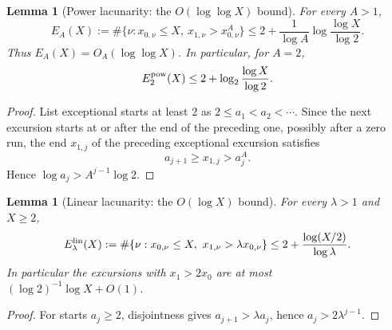 \documentclass[11pt]{amsart}
\numberwithin{equation}{section}
\theoremstyle{plain}
\newtheorem{lemma}[theorem]{Lemma}
\theoremstyle{definition}
\theoremstyle{remark}
\begin{document}
\begin{lemma}[Power lacunarity: the $O(\log\log X)$ bound]
\label{lem:power-lacunary}
For every $A>1$,
\begin{equation}
\label{eq:power-lacunary-count}
E_A(X):=\#\{\nu:x_{0,\nu}\le X,\ x_{1,\nu}>x_{0,\nu}^A\}
\le2+\frac1{\log A}\log\frac{\log X}{\log2}.
\end{equation}
Thus $E_A(X)=O_A(\log\log X)$. In particular, for $A=2$,
\begin{equation}
\label{eq:square-exception-count}
E_2^{\rm pow}(X)\le2+\log_2\frac{\log X}{\log2}.
\end{equation}
\end{lemma}

\begin{proof}
List exceptional starts at least $2$ as $2\le a_1<a_2<\cdots$. Since the
next excursion starts at or after the end of the preceding one, possibly
after a zero run,
the end $x_{1,j}$ of the preceding exceptional excursion satisfies
\[
a_{j+1}\ge x_{1,j}>a_j^A.
\]
Hence $\log a_j>A^{j-1}\log2$.
\end{proof}

\begin{lemma}[Linear lacunarity: the $O(\log X)$ bound]
\label{lem:linear-lacunary}
For every $\lambda>1$ and $X\ge2$,
\begin{equation}
\label{eq:linear-lacunary-count}
E_\lambda^{\rm lin}(X):=
\#\{\nu:x_{0,\nu}\le X,\ x_{1,\nu}>\lambda x_{0,\nu}\}
\le2+\frac{\log(X/2)}{\log\lambda}.
\end{equation}
In particular the excursions with $x_1>2x_0$ are at most
$(\log2)^{-1}\log X+O(1)$.
\end{lemma}

\begin{proof}
For starts $a_j\ge2$, disjointness gives $a_{j+1}>\lambda a_j$, hence
$a_j>2\lambda^{j-1}$.
\end{proof}
\end{document}
